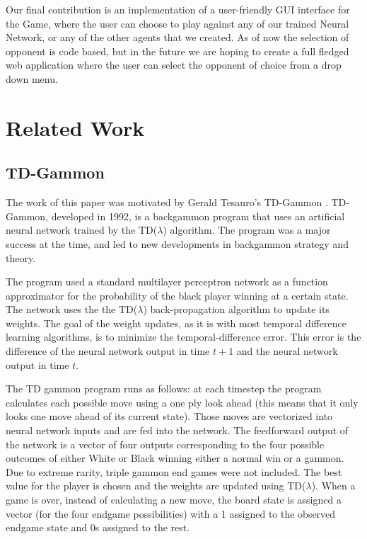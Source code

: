 \documentclass{sig-alternate-05-2015}
\begin{document}
Our final contribution is an implementation of a user-friendly GUI interface for the Game, where the user can choose to play against any of our trained Neural Network, or any of the other agents that we created. As of now the selection of opponent is code based, but in the future we are hoping to create a full fledged web application where the user can select the opponent of choice from a drop down menu. 



\section{Related Work}

\subsection{TD-Gammon}
The work of this paper was motivated by Gerald Tesauro's TD-Gammon \cite{tesauro1995temporal}. TD-Gammon, developed in 1992, is a backgammon program that uses an artificial neural network trained by the TD(\(\lambda\)) algorithm. The program was a major success at the time, and led to new developments in backgammon strategy and theory.

The program used a standard multilayer perceptron network as a function approximator for the probability of the black player winning at a certain state. The network uses the the TD(\(\lambda\)) back-propagation algorithm to update its weights. The goal of the weight updates, as it is with most temporal difference learning algorithms, is to minimize the temporal-difference error. This error is the difference of the neural network output in time $t+1$ and the neural network output in time $t$. 

The TD gammon program runs as follows: at each timestep the program calculates each possible move using a one ply look ahead (this means that it only looks one move ahead of its current state). Those moves are vectorized into neural network inputs and are fed into the network. The feedforward output of the network is a vector of four outputs corresponding to the four possible outcomes of either White or Black winning either a normal win or a gammon. Due to extreme rarity, triple gammon end games were not included. The best value for the player is chosen and the weights are updated using TD(\(\lambda\)). When a game is over, instead of calculating a new move, the board state is assigned a vector (for the four endgame possibilities) with a 1 assigned to the observed endgame state and 0s assigned to the rest.
\end{document}
